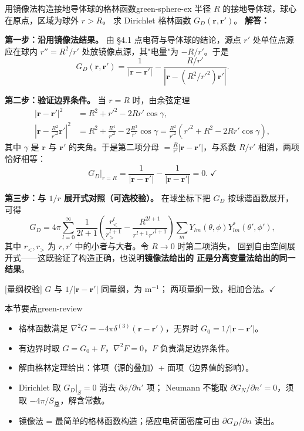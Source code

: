 \documentclass[11pt,a4paper,openany,oneside]{book}
\newcommand{\vect}[1]{\bm{#1}}
\newcommand{\lap}{\nabla^2}
\newcommand{\difficulty}[1]{\marginnote{\textcolor{red}{\textbf{[#1]}}}}
\begin{document}
\begin{example}{用镜像法构造接地导体球的格林函数}{green-sphere-ex}
\difficulty{提高}
半径 $R$ 的接地导体球，球心在原点，区域为球外 $r>R$。
求 Dirichlet 格林函数 $G_D(\vect r,\vect r')$。
\tcblower
\textbf{解答：}

\textbf{第一步：沿用镜像法结果。}
由 §4.1 点电荷与导体球的结论，源点 $r'$ 处单位点源应在球内
$r'' = R^2/r'$ 处放镜像点源，其"电量"为 $-R/r'$。于是
\[
G_D(\vect r,\vect r') = \frac{1}{|\vect r - \vect r'|}
- \frac{R/r'}{|\vect r - (R^2/r'^2)\vect r'|}.
\]

\textbf{第二步：验证边界条件。}
当 $r = R$ 时，由余弦定理
\begin{align*}
|\vect r - \vect r'|^2 &= R^2 + r'^2 - 2Rr'\cos\gamma, \\
\left|\vect r - \tfrac{R^2}{r'^2}\vect r'\right|^2
&= R^2 + \tfrac{R^4}{r'^2} - 2\tfrac{R^3}{r'}\cos\gamma
= \tfrac{R^2}{r'^2}\left(r'^2 + R^2 - 2Rr'\cos\gamma\right),
\end{align*}
其中 $\gamma$ 是 $\vect r$ 与 $\vect r'$ 的夹角。于是第二项分母
$= \tfrac{R}{r'}|\vect r - \vect r'|$，与系数 $R/r'$ 相消，两项恰好相等：
\[
G_D\big|_{r=R} = \frac{1}{|\vect r-\vect r'|} - \frac{1}{|\vect r-\vect r'|} = 0.\;\checkmark
\]

\textbf{第三步：与 $1/r$ 展开式对照（可选校验）。}
在球坐标下把 $G_D$ 按球谐函数展开，可得
\[
G_D = 4\pi\sum_{l=0}^{\infty}\frac{1}{2l+1}
\left(\frac{r_<^l}{r_>^{l+1}} - \frac{R^{2l+1}}{r^{l+1}r'^{l+1}}\right)
\sum_m Y_{lm}(\theta,\phi)Y_{lm}^*(\theta',\phi'),
\]
其中 $r_<,r_>$ 为 $r,r'$ 中的小者与大者。令 $R\to 0$ 时第二项消失，
回到自由空间展开式——这既验证了构造正确，也说明\textbf{镜像法给出的
正是分离变量法给出的同一结果}。

[量纲校验] $G$ 与 $1/|\vect r-\vect r'|$ 同量纲，为 $\mathrm{m^{-1}}$；
两项量纲一致，相加合法。$\checkmark$
\end{example}

\begin{review}{本节要点}{green-review}
\begin{itemize}[nosep]
\item 格林函数满足 $\lap G = -4\pi\delta^{(3)}(\vect r-\vect r')$，无界时 $G_0 = 1/|\vect r-\vect r'|$。
\item 有边界时取 $G = G_0 + F$，$\lap F = 0$，$F$ 负责满足边界条件。
\item 解由格林定理给出：体项（源的叠加）+ 面项（边界值的影响）。
\item Dirichlet 取 $G_D|_S = 0$ 消去 $\partial\phi/\partial n'$ 项；
  Neumann 不能取 $\partial G_N/\partial n' = 0$，须取 $-4\pi/S_{\text{总}}$，解含常数。
\item 镜像法 = 最简单的格林函数构造；感应电荷面密度可由 $\partial G_D/\partial n$ 读出。
\end{itemize}
\end{review}
\end{document}
